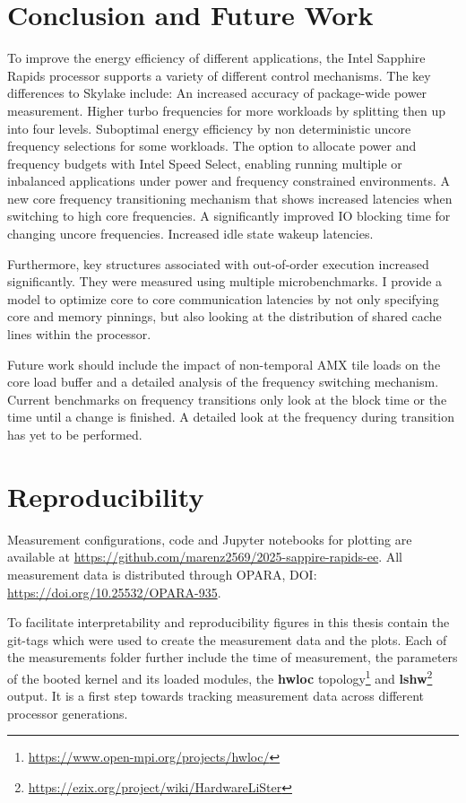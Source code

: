 \chapter{Conclusion and Future Work}
\label{sec:summary}

To improve the energy efficiency of different applications, the Intel Sapphire Rapids processor supports a variety of different control mechanisms.
The key differences to Skylake include:
An increased accuracy of package-wide power measurement.
Higher turbo frequencies for more workloads by splitting then up into four levels.
Suboptimal energy efficiency by non deterministic uncore frequency selections for some workloads.
The option to allocate power and frequency budgets with Intel Speed Select, enabling running multiple or inbalanced applications under power and frequency constrained environments.
A new core frequency transitioning mechanism that shows increased latencies when switching to high core frequencies.
A significantly improved IO blocking time for changing uncore frequencies.
Increased idle state wakeup latencies.

Furthermore, key structures associated with out-of-order execution increased significantly.
They were measured using multiple microbenchmarks.
I provide a model to optimize core to core communication latencies by not only specifying core and memory pinnings, but also looking at the distribution of shared cache lines within the processor.

Future work should include the impact of non-temporal AMX tile loads on the core load buffer and a detailed analysis of the frequency switching mechanism.
Current benchmarks on frequency transitions only look at the block time or the time until a change is finished.
A detailed look at the frequency during transition has yet to be performed.

\chapter*{Reproducibility}
Measurement configurations, code and Jupyter notebooks for plotting are available at \url{https://github.com/marenz2569/2025-sappire-rapids-ee}.
All measurement data is distributed through OPARA, DOI: \url{https://doi.org/10.25532/OPARA-935}.

To facilitate interpretability and reproducibility figures in this thesis contain the git-tags which were used to create the measurement data and the plots.
Each of the measurements folder further include the time of measurement, the parameters of the booted kernel and its loaded modules, the \textbf{hwloc} topology\footnote{\url{https://www.open-mpi.org/projects/hwloc/}} and \textbf{lshw}\footnote{\url{https://ezix.org/project/wiki/HardwareLiSter}} output.
It is a first step towards tracking measurement data across different processor generations.